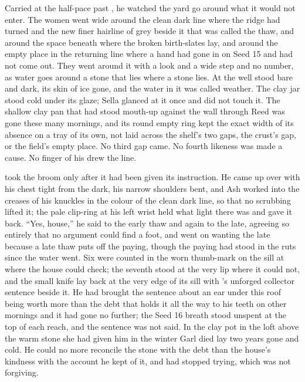 Carried at the half-pace past , he watched the yard go around what it would not enter. The women went wide around the clean dark line where the  ridge had turned and the new finer hairline of grey beside it that was called the thaw, and around the space beneath  where the broken birth-slates lay, and around the empty place in the returning line where a hand had gone in on Seed 15 and had not come out. They went around it with a look and a wide step and no number, as water goes around a stone that lies where a stone lies. At the well  stood bare and dark, its skin of ice gone, and the water in it was called weather. The clay jar stood cold under its glaze; Sella glanced at it once and did not touch it. The shallow clay pan that had stood mouth-up against the wall through Reed was gone these many mornings, and its round empty ring kept the exact width of its absence on a tray of its own, not laid across the shelf's two gaps, the crust's gap, or the field's empty place. No third gap came. No fourth likeness was made a cause. No finger of his drew the line.

 took the broom only after it had been given its instruction. He came up over  with his chest tight from the dark, his narrow shoulders bent, and Ash worked into the creases of his knuckles in the colour of the clean dark line, so that no scrubbing lifted it; the pale clip-ring at his left wrist held what light there was and gave it back. “Yes, house,” he said to the early thaw and again to the late, agreeing so entirely that no argument could find a foot, and went on wanting the late because a late thaw puts off the paying, though the paying had stood in the ruts since the water went. Six were counted in the worn thumb-mark on the sill at  where the house could check; the seventh stood at the very lip where it could not, and the small knife lay back at the very edge of its sill with 's unforged collector sentence beside it. He had brought the sentence about an ear under this roof being worth more than the debt that holds it all the way to his teeth on other mornings and it had gone no further; the Seed 16 breath stood unspent at the top of each reach, and the sentence was not said. In the clay pot in the loft above  the warm stone she had given him in the winter Garl died lay two years gone and cold. He could no more reconcile the stone with the debt than the house's kindness with the account he kept of it, and had stopped trying, which was not forgiving.

